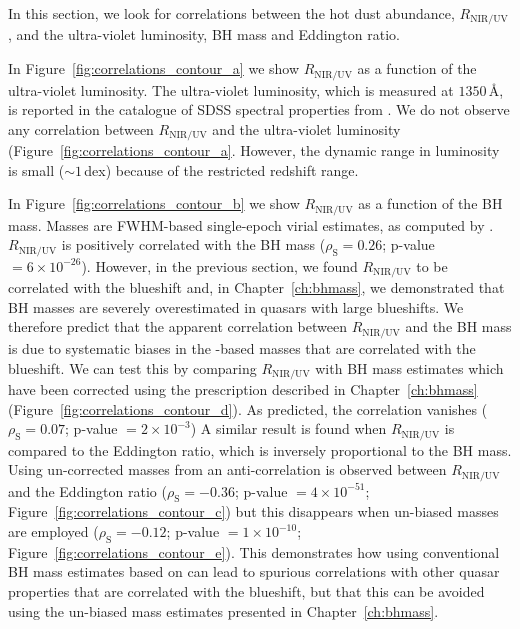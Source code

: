 In this section, we look for correlations between the hot dust abundance, $R_{\text{NIR/UV}}$, and the ultra-violet luminosity, BH mass and Eddington ratio. 

In Figure~\ref{fig:correlations_contour_a} we show $R_{\text{NIR/UV}}$ as a function of the ultra-violet luminosity. 
The ultra-violet luminosity, which is measured at $1350$\,\AA, is reported in the catalogue of SDSS spectral properties from \citet{shen11}. 
We do not observe any correlation between $R_{\text{NIR/UV}}$ and the ultra-violet luminosity (Figure~\ref{fig:correlations_contour_a}. 
However, the dynamic range in luminosity is small ($\sim1$\,dex) because of the restricted redshift range. 

In Figure~\ref{fig:correlations_contour_b} we show $R_{\text{NIR/UV}}$ as a function of the BH mass. 
Masses are  FWHM-based single-epoch virial estimates, as computed by \citet{shen11}. 
$R_{\text{NIR/UV}}$ is positively correlated with the BH mass ($\rho_{\text{S}} = 0.26$; p-value $=6\times10^{-26
}$). 
However, in the previous section, we found $R_{\text{NIR/UV}}$ to be correlated with the  blueshift and, in Chapter~\ref{ch:bhmass}, we demonstrated that BH masses are severely overestimated in quasars with large  blueshifts.
We therefore predict that the apparent correlation between $R_{\text{NIR/UV}}$ and the BH mass is due to systematic biases in the -based masses that are correlated with the  blueshift. 
We can test this by comparing $R_{\text{NIR/UV}}$ with BH mass estimates which have been corrected using the prescription described in Chapter~\ref{ch:bhmass} (Figure~\ref{fig:correlations_contour_d}). 
As predicted, the correlation vanishes ($\rho_{\text{S}}=0.07$; p-value $=2\times10^{-3}$)
A similar result is found when $R_{\text{NIR/UV}}$ is compared to the Eddington ratio, which is inversely proportional to the BH mass.  
Using un-corrected masses from \citet{shen11} an anti-correlation is observed between $R_{\text{NIR/UV}}$ and the Eddington ratio ($\rho_{\text{S}}=-0.36$; p-value $=4\times10^{-51}$; Figure~\ref{fig:correlations_contour_c}) but this disappears when un-biased masses are employed ($\rho_{\text{S}}=-0.12$; p-value $=1\times10^{-10}$; Figure~\ref{fig:correlations_contour_e}). 
This demonstrates how using conventional BH mass estimates based on  can lead to spurious correlations with other quasar properties that are correlated with the  blueshift, but that this can be avoided using the un-biased mass estimates presented in Chapter~\ref{ch:bhmass}. 

